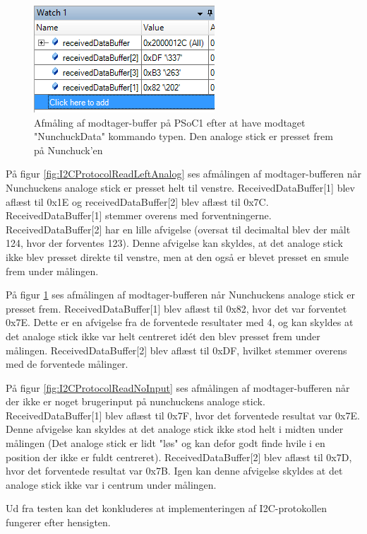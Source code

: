 \begin{figure}[H]
	\centering
	\includegraphics[width=.5\textwidth]{Test/images/I2CProtocolReadUpAnalog.png}
	\caption{Afmåling af modtager-buffer på PSoC1 efter at have modtaget "NunchuckData" kommando typen. Den analoge stick er presset frem på Nunchuck'en}
	\label{fig:I2CProtocolReadUpAnalog}
\end{figure}

På figur \ref{fig:I2CProtocolReadLeftAnalog} ses afmålingen af modtager-bufferen når Nunchuckens analoge stick er presset helt til venstre. ReceivedDataBuffer[1] blev aflæst til 0x1E og receivedDataBuffer[2] blev aflæst til 0x7C. ReceivedDataBuffer[1] stemmer overens med forventningerne. ReceivedDataBuffer[2] har en lille afvigelse (oversat til decimaltal blev der målt 124, hvor der forventes 123). Denne afvigelse kan skyldes, at det analoge stick ikke blev presset direkte til venstre, men at den også er blevet presset en smule frem under målingen.

På figur \ref{fig:I2CProtocolReadUpAnalog} ses afmålingen af modtager-bufferen når Nunchuckens analoge stick er presset frem. ReceivedDataBuffer[1] blev aflæst til 0x82, hvor det var forventet 0x7E. Dette er en afvigelse fra de forventede resultater med 4, og kan skyldes at det analoge stick ikke var helt centreret idét den blev presset frem under målingen. ReceivedDataBuffer[2] blev aflæst til 0xDF, hvilket stemmer overens med de forventede målinger.

På figur \ref{fig:I2CProtocolReadNoInput} ses afmålingen af modtager-bufferen når der ikke er noget brugerinput på nunchuckens analoge stick. ReceivedDataBuffer[1] blev aflæst til 0x7F, hvor det forventede resultat var 0x7E. Denne afvigelse kan skyldes at det analoge stick ikke stod helt i midten under målingen (Det analoge stick er lidt "løs" og kan defor godt finde hvile i en position der ikke er fuldt centreret). ReceivedDataBuffer[2] blev aflæst til 0x7D, hvor det forventede resultat var 0x7B. Igen kan denne afvigelse skyldes at det analoge stick ikke var i centrum under målingen.

Ud fra testen kan det konkluderes at implementeringen af I2C-protokollen fungerer efter hensigten.

